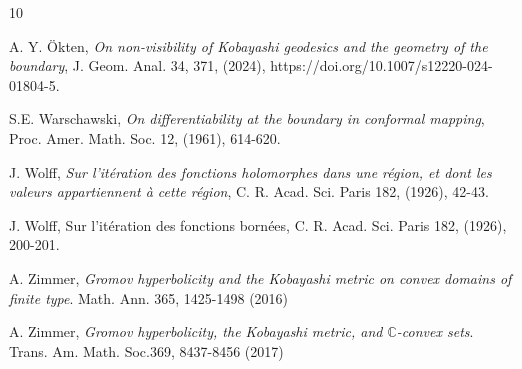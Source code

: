 \documentclass[12pt]{amsart}
\theoremstyle{definition}
\theoremstyle{remark}
\numberwithin{equation}{section}
\def\C{\mathbb C}
\begin{document}
\begin{thebibliography}{10}

 {\sc A. Y. \"Okten}, {\it On non-visibility of Kobayashi geodesics and the geometry of the boundary}, J. Geom. Anal. 34, 371, (2024), https://doi.org/10.1007/s12220-024-01804-5.


 {\sc S.E. Warschawski}, {\it On differentiability at the boundary in conformal mapping}, Proc. Amer. Math. Soc. 12, (1961), 614-620.

 {\sc J. Wolff}, {\it Sur l'it\'eration des fonctions holomorphes dans une r\'egion, et dont les valeurs appartiennent \`a cette r\'egion}, C. R. Acad. Sci. Paris 182, (1926), 42-43.

 {\sc J. Wolff}, { Sur l'it\'eration des fonctions born\'ees}, C. R. Acad. Sci. Paris 182, (1926), 200-201.

 {\sc A. Zimmer}, {\sl Gromov hyperbolicity and the Kobayashi metric on convex domains of finite type}. Math. Ann. 365, 1425-1498 (2016)

 {\sc A. Zimmer}, {\sl Gromov hyperbolicity, the Kobayashi metric, and $\C$-convex sets}. Trans. Am. Math. Soc.369, 8437-8456 (2017)
		


\end{thebibliography}
	
\end{document}
